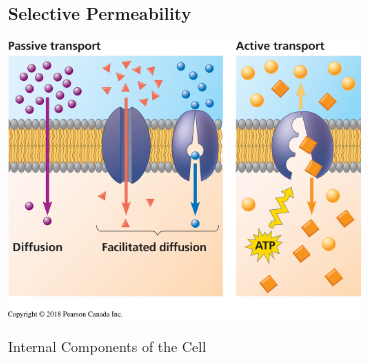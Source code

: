 \documentclass[10pt]{beamer}
\begin{document}
\begin{frame}
\frametitle{Selective Permeability}
\vspace{0.5cm}

	\begin{center}
		\includegraphics[width=0.70\textwidth]{figures/fg07_16.jpg}
	\end{center}

\end{frame}


\begin{frame}
	
	\begin{center}
		\LARGE{\textcolor{myblue}{Internal Components of the Cell}}
	\end{center}

\end{frame}
\end{document}
